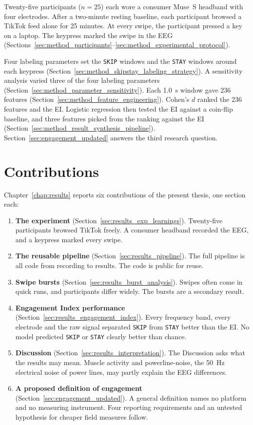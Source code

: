 \documentclass[12pt,a4paper]{report}
\begin{document}
Twenty-five participants ($n=25$) each wore a consumer Muse~S headband with four electrodes. After a two-minute resting baseline, each participant browsed a TikTok feed alone for 25 minutes. At every swipe, the participant pressed a key on a laptop. The keypress marked the swipe in the EEG (Sections~\ref{sec:method_participants}--\ref{sec:method_experimental_protocol}).

Four labeling parameters set the \texttt{SKIP} windows and the \texttt{STAY} windows around each keypress (Section~\ref{sec:method_skipstay_labeling_strategy}). A sensitivity analysis varied three of the four labeling parameters (Section~\ref{sec:method_parameter_sensitivity}). Each 1.0~s window gave 236 features (Section~\ref{sec:method_feature_engineering}). Cohen's $d$ ranked the 236 features and the EI. Logistic regression then tested the EI against a coin-flip baseline, and three features picked from the ranking against the EI (Section~\ref{sec:method_result_synthesis_pipeline}). Section~\ref{sec:engagement_updated} answers the third research question.

\section{Contributions}
\label{sec:contributions}

Chapter~\ref{chap:results} reports six contributions of the present thesis, one section each:

\begin{enumerate}
    \item \textbf{The experiment} (Section~\ref{sec:results_exp_learnings}). Twenty-five participants browsed TikTok freely. A consumer headband recorded the EEG, and a keypress marked every swipe.
    \item \textbf{The reusable pipeline} (Section~\ref{sec:results_pipeline}). The full pipeline is all code from recording to results. The code is public for reuse.
    \item \textbf{Swipe bursts} (Section~\ref{sec:results_burst_analysis}). Swipes often come in quick runs, and participants differ widely. The bursts are a secondary result.
    \item \textbf{Engagement Index performance} (Section~\ref{sec:results_engagement_index}). Every frequency band, every electrode and the raw signal separated \texttt{SKIP} from \texttt{STAY} better than the EI. No model predicted \texttt{SKIP} or \texttt{STAY} clearly better than chance.
    \item \textbf{Discussion} (Section~\ref{sec:results_interpretation}). The Discussion asks what the results may mean. Muscle activity and powerline-noise, the 50~Hz electrical noise of power lines, may partly explain the EEG differences.
    \item \textbf{A proposed definition of engagement} (Section~\ref{sec:engagement_updated}). A general definition names no platform and no measuring instrument. Four reporting requirements and an untested hypothesis for cheaper field measures follow.
\end{enumerate}
\end{document}
